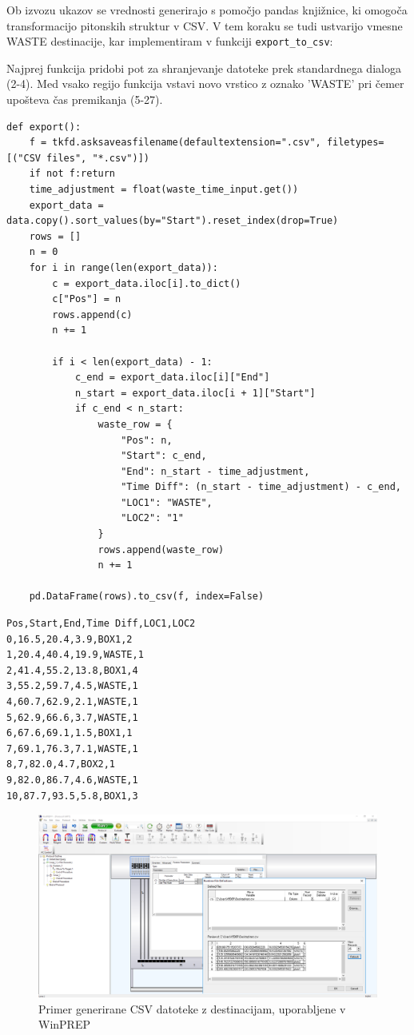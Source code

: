 \documentclass[a4paper,12pt]{article}
\begin{document}
Ob izvozu ukazov se vrednosti generirajo s pomočjo pandas\cite{pandas} knjižnice, ki omogoča transformacijo pitonskih struktur v CSV. V tem koraku se tudi ustvarijo vmesne WASTE destinacije, kar implementiram v funkciji \texttt{export\_to\_csv}:

Najprej funkcija pridobi pot za shranjevanje datoteke prek standardnega dialoga (2-4). Med vsako regijo funkcija vstavi novo vrstico z oznako 'WASTE' pri čemer upošteva čas premikanja (5-27).

\begin{lstlisting}[caption={Funkcija za izvoz podatkov v CSV}, label={lst:exportcsv}]
def export():
    f = tkfd.asksaveasfilename(defaultextension=".csv", filetypes=[("CSV files", "*.csv")])
    if not f:return
    time_adjustment = float(waste_time_input.get())
    export_data = data.copy().sort_values(by="Start").reset_index(drop=True)
    rows = []
    n = 0
    for i in range(len(export_data)):
        c = export_data.iloc[i].to_dict()
        c["Pos"] = n
        rows.append(c)
        n += 1

        if i < len(export_data) - 1:
            c_end = export_data.iloc[i]["End"]
            n_start = export_data.iloc[i + 1]["Start"]
            if c_end < n_start:
                waste_row = {
                    "Pos": n,
                    "Start": c_end,
                    "End": n_start - time_adjustment,
                    "Time Diff": (n_start - time_adjustment) - c_end,
                    "LOC1": "WASTE",
                    "LOC2": "1"
                }
                rows.append(waste_row)
                n += 1

    pd.DataFrame(rows).to_csv(f, index=False)
\end{lstlisting}

\begin{lstlisting}[caption={CSV datoteka}]
Pos,Start,End,Time Diff,LOC1,LOC2
0,16.5,20.4,3.9,BOX1,2
1,20.4,40.4,19.9,WASTE,1
2,41.4,55.2,13.8,BOX1,4
3,55.2,59.7,4.5,WASTE,1
4,60.7,62.9,2.1,WASTE,1
5,62.9,66.6,3.7,WASTE,1
6,67.6,69.1,1.5,BOX1,1
7,69.1,76.3,7.1,WASTE,1
8,7,82.0,4.7,BOX2,1
9,82.0,86.7,4.6,WASTE,1
10,87.7,93.5,5.8,BOX1,3
\end{lstlisting}
\begin{figure}[H]
        \centering
        \includegraphics[width=\textwidth]{assets/1.png}
        \caption{Primer generirane CSV datoteke z destinacijam, uporabljene v WinPREP}
        \label{fig:csv_output}
\end{figure}
\end{document}
